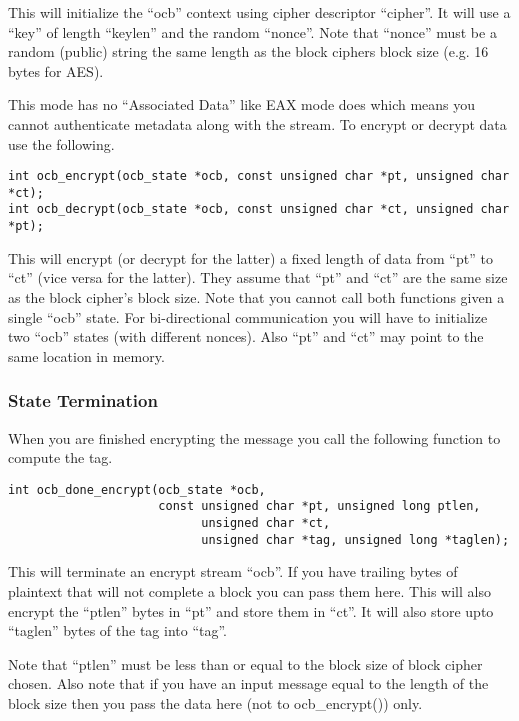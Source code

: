 \documentclass[a4paper]{book}
\begin{document}
This will initialize the ``ocb'' context using cipher descriptor ``cipher''.  It will use a ``key'' of length ``keylen''
and the random ``nonce''.  Note that ``nonce'' must be a random (public) string the same length as the block ciphers
block size (e.g. 16 bytes for AES).

This mode has no ``Associated Data'' like EAX mode does which means you cannot authenticate metadata along with the stream.
To encrypt or decrypt data use the following.

 
\begin{verbatim}
int ocb_encrypt(ocb_state *ocb, const unsigned char *pt, unsigned char *ct);
int ocb_decrypt(ocb_state *ocb, const unsigned char *ct, unsigned char *pt);
\end{verbatim}

This will encrypt (or decrypt for the latter) a fixed length of data from ``pt'' to ``ct'' (vice versa for the latter).  
They assume that ``pt'' and ``ct'' are the same size as the block cipher's block size.  Note that you cannot call 
both functions given a single ``ocb'' state.  For bi-directional communication you will have to initialize two ``ocb''
states (with different nonces).  Also ``pt'' and ``ct'' may point to the same location in memory.

\subsubsection{State Termination}

When you are finished encrypting the message you call the following function to compute the tag.

\begin{verbatim}
int ocb_done_encrypt(ocb_state *ocb, 
                     const unsigned char *pt, unsigned long ptlen,
                           unsigned char *ct, 
                           unsigned char *tag, unsigned long *taglen);
\end{verbatim}

This will terminate an encrypt stream ``ocb''.  If you have trailing bytes of plaintext that will not complete a block 
you can pass them here.  This will also encrypt the ``ptlen'' bytes in ``pt'' and store them in ``ct''.  It will also
store upto ``taglen'' bytes of the tag into ``tag''.

Note that ``ptlen'' must be less than or equal to the block size of block cipher chosen.  Also note that if you have 
an input message equal to the length of the block size then you pass the data here (not to ocb\_encrypt()) only.  
\end{document}
